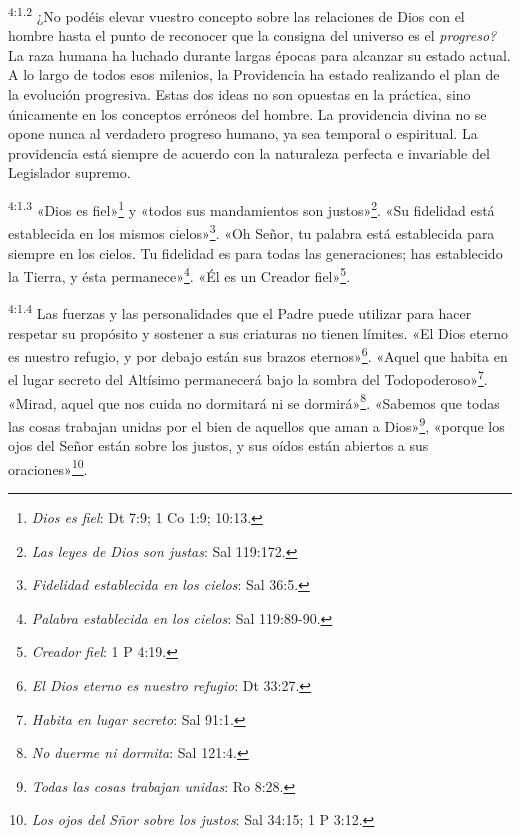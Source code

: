 \par
\textsuperscript{4:1.2} ¿No podéis elevar vuestro concepto sobre las relaciones de Dios con el hombre hasta el punto de reconocer que la consigna del universo es el \textit{progreso?} La raza humana ha luchado durante largas épocas para alcanzar su estado actual. A lo largo de todos esos milenios, la Providencia ha estado realizando el plan de la evolución progresiva. Estas dos ideas no son opuestas en la práctica, sino únicamente en los conceptos erróneos del hombre. La providencia divina no se opone nunca al verdadero progreso humano, ya sea temporal o espiritual. La providencia está siempre de acuerdo con la naturaleza perfecta e invariable del Legislador supremo.

\par
\textsuperscript{4:1.3} «Dios es fiel»\footnote{\textit{Dios es fiel}: Dt 7:9; 1 Co 1:9; 10:13.} y «todos sus mandamientos son justos»\footnote{\textit{Las leyes de Dios son justas}: Sal 119:172.}. «Su fidelidad está establecida en los mismos cielos»\footnote{\textit{Fidelidad establecida en los cielos}: Sal 36:5.}. «Oh Señor, tu palabra está establecida para siempre en los cielos. Tu fidelidad es para todas las generaciones; has establecido la Tierra, y ésta permanece»\footnote{\textit{Palabra establecida en los cielos}: Sal 119:89-90.}. «Él es un Creador fiel»\footnote{\textit{Creador fiel}: 1 P 4:19.}.

\par
\textsuperscript{4:1.4} Las fuerzas y las personalidades que el Padre puede utilizar para hacer respetar su propósito y sostener a sus criaturas no tienen límites. «El Dios eterno es nuestro refugio, y por debajo están sus brazos eternos»\footnote{\textit{El Dios eterno es nuestro refugio}: Dt 33:27.}. «Aquel que habita en el lugar secreto del Altísimo permanecerá bajo la sombra del Todopoderoso»\footnote{\textit{Habita en lugar secreto}: Sal 91:1.}. «Mirad, aquel que nos cuida no dormitará ni se dormirá»\footnote{\textit{No duerme ni dormita}: Sal 121:4.}. «Sabemos que todas las cosas trabajan unidas por el bien de aquellos que aman a Dios»\footnote{\textit{Todas las cosas trabajan unidas}: Ro 8:28.}, «porque los ojos del Señor están sobre los justos, y sus oídos están abiertos a sus oraciones»\footnote{\textit{Los ojos del Sñor sobre los justos}: Sal 34:15; 1 P 3:12.}.

